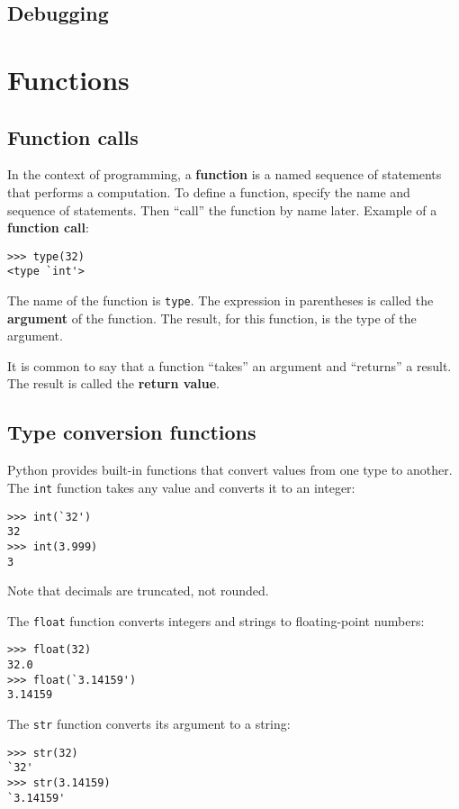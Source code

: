 \documentclass{article}
\begin{document}
\subsection{Debugging}

\section{Functions}
\subsection{Function calls}
In the context of programming, a \textbf{function} is a named
sequence of statements that performs a computation.
To define a function, specify the name and sequence of
statements. Then ``call'' the function by name later.
Example of a \textbf{function call}:
\begin{verbatim}
>>> type(32)
<type `int'>
\end{verbatim}
The name of the function is \verb|type|. The expression in
parentheses is called the \textbf{argument} of the function.
The result, for this function, is the type of the argument.

It is common to say that a function ``takes'' an argument and
``returns'' a result. The result is called the \textbf{return value}.
\subsection{Type conversion functions}
Python provides built-in functions that convert values from
one type to another. The \verb|int| function takes any value
and converts it to an integer:
\begin{verbatim}
>>> int(`32')
32
>>> int(3.999)
3
\end{verbatim}
Note that decimals are truncated, not rounded.

The \verb|float| function converts integers and strings to
floating-point numbers:
\begin{verbatim}
>>> float(32)
32.0
>>> float(`3.14159')
3.14159
\end{verbatim}
The \verb|str| function converts its argument to a string:
\begin{verbatim}
>>> str(32)
`32'
>>> str(3.14159)
`3.14159'
\end{verbatim}
\end{document}
